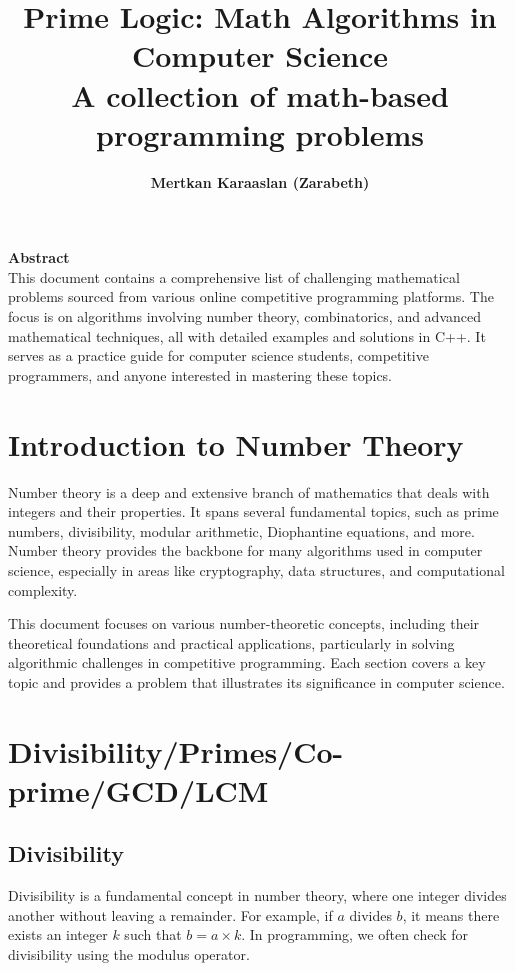 \documentclass[10pt,a4paper]{article}
\title{\Huge \textbf{Prime Logic: Math Algorithms in Computer Science}\\[0.5cm]
\Large A collection of math-based programming problems}
\author{\textbf{Mertkan Karaaslan (Zarabeth)}}
\date{}
\begin{document}
\maketitle


\vspace{2cm}

\vfill

\begin{center}
    \textbf{Abstract}\\[0.5cm]
    This document contains a comprehensive list of challenging mathematical problems sourced from various online competitive programming platforms. The focus is on algorithms involving number theory, combinatorics, and advanced mathematical techniques, all with detailed examples and solutions in C++. It serves as a practice guide for computer science students, competitive programmers, and anyone interested in mastering these topics.
\end{center}

\vfill

\newpage

\newpage
\pagestyle{fancy}
\section*{Introduction to Number Theory}

Number theory is a deep and extensive branch of mathematics that deals with integers and their properties. It spans several fundamental topics, such as prime numbers, divisibility, modular arithmetic, Diophantine equations, and more. Number theory provides the backbone for many algorithms used in computer science, especially in areas like cryptography, data structures, and computational complexity. 

This document focuses on various number-theoretic concepts, including their theoretical foundations and practical applications, particularly in solving algorithmic challenges in competitive programming. Each section covers a key topic and provides a problem that illustrates its significance in computer science.



\section*{Divisibility/Primes/Co-prime/GCD/LCM}

\subsection*{Divisibility}
Divisibility is a fundamental concept in number theory, where one integer divides another without leaving a remainder. For example, if \(a\) divides \(b\), it means there exists an integer \(k\) such that \(b = a \times k\). In programming, we often check for divisibility using the modulus operator.
\end{document}
